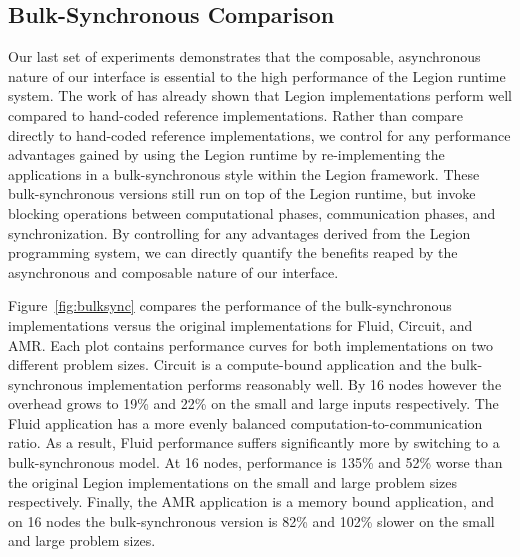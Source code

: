 

\subsection{Bulk-Synchronous Comparison}
\label{subsec:bulkcomp}

Our last set of experiments demonstrates that the composable, asynchronous nature of our interface
is essential to the high performance of the Legion runtime system.  The work
of \cite{Legion12} has already shown that Legion implementations perform well compared
to hand-coded reference implementations.  Rather than compare directly to hand-coded
reference implementations, we control for any performance advantages gained by using
the Legion runtime by re-implementing the applications in a bulk-synchronous
style within the Legion framework.  These bulk-synchronous versions still run on top of 
the Legion runtime, but invoke blocking operations between computational phases,
communication phases, and synchronization.  By controlling for any advantages derived
from the Legion programming system, we can directly quantify the benefits
reaped by the asynchronous and composable nature of our interface.

Figure~\ref{fig:bulksync} compares
the performance of the bulk-synchronous implementations versus the original
implementations for Fluid, Circuit, and AMR.  Each plot contains
performance curves for both implementations on two different problem sizes.
Circuit is a compute-bound application and the bulk-synchronous implementation
performs reasonably well.  By 16 nodes however the overhead grows to 19\%
and 22\% on the small and large inputs respectively.  The Fluid application 
has a more evenly balanced computation-to-communication ratio.  As a result,
Fluid performance suffers significantly more by switching to
a bulk-synchronous model.  At 16 nodes, performance is 135\% and 52\% worse
than the original Legion implementations on the small and large problem sizes
respectively.  Finally, the AMR application is a memory bound application, and on 16 nodes
the bulk-synchronous version is 82\% and 102\% slower on the small and
large problem sizes.

